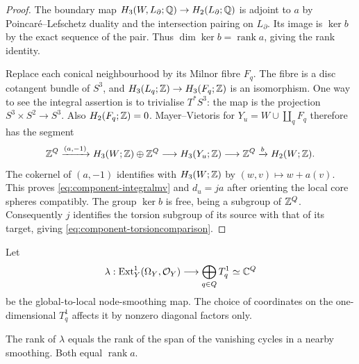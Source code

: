 \begin{proof}
The boundary map $H_3(W,L_\partial;\mathbb Q)\to H_2(L_\partial;\mathbb Q)$
is adjoint to $a$ by Poincar\'e--Lefschetz duality and the intersection
pairing on $L_\partial$. Its image is $\ker b$ by the exact sequence of
the pair. Thus $\dim\ker b=\operatorname{rank} a$, giving the rank identity.

Replace each conical neighbourhood by its Milnor fibre $F_q$.
The fibre is a disc cotangent bundle of $S^3$, and
$H_3(L_q;\mathbb Z)\to H_3(F_q;\mathbb Z)$ is an isomorphism. One way to see the
integral assertion is to trivialise $T^*S^3$: the map is the projection
$S^3\times S^2\to S^3$. Also $H_2(F_q;\mathbb Z)=0$.
Mayer--Vietoris for $Y_u=W\cup\coprod_qF_q$ therefore has the segment
\[
 \mathbb Z^Q\xrightarrow{(a,-1)}H_3(W;\mathbb Z)\oplus\mathbb Z^Q
 \longrightarrow H_3(Y_u;\mathbb Z)
 \longrightarrow\mathbb Z^Q\xrightarrow{b}H_2(W;\mathbb Z).
\]
The cokernel of $(a,-1)$ identifies with $H_3(W;\mathbb Z)$ by
$(w,v)\mapsto w+a(v)$. This proves \eqref{eq:component-integralmv} and
$d_u=ja$ after orienting the local core spheres compatibly.
The group $\ker b$ is free, being a subgroup of $\mathbb Z^Q$.
Consequently $j$ identifies the torsion subgroup of its source with that
of its target, giving \eqref{eq:component-torsioncomparison}.
\end{proof}

Let
\[
 \lambda:\operatorname{Ext}^1_Y(\Omega_Y,\mathcal O_Y)
       \longrightarrow\bigoplus_{q\in Q}T^1_q\simeq\mathbb C^Q
\]
be the global-to-local node-smoothing map. The choice of coordinates on
the one-dimensional $T^1_q$ affects it by nonzero diagonal factors only.

\begin{lemma}\label{lem:component-rank}
The rank of $\lambda$ equals the rank of the span of the vanishing
cycles in a nearby smoothing. Both equal $\operatorname{rank} a$.
\end{lemma}


